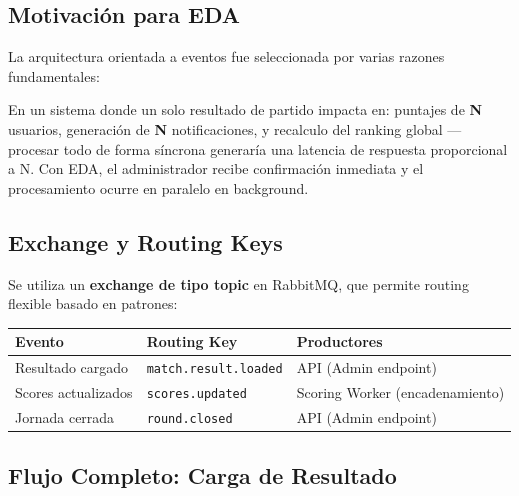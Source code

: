 \documentclass[12pt,a4paper]{article}
\newcommand{\code}[1]{\texttt{\small\color{navy}#1}}
\begin{document}
\subsection{Motivación para EDA}

La arquitectura orientada a eventos fue seleccionada por varias razones fundamentales:

\begin{infobox}
En un sistema donde un solo resultado de partido impacta en: puntajes de \textbf{N} usuarios,
generación de \textbf{N} notificaciones, y recalculo del ranking global — procesar todo de forma
síncrona generaría una latencia de respuesta proporcional a N. Con EDA, el administrador recibe
confirmación inmediata y el procesamiento ocurre en paralelo en background.
\end{infobox}

\subsection{Exchange y Routing Keys}

Se utiliza un \textbf{exchange de tipo topic} en RabbitMQ, que permite routing flexible basado
en patrones:

\begin{center}
\begin{tabular}{@{}lll@{}}
  \toprule
  \textbf{Evento} & \textbf{Routing Key} & \textbf{Productores} \\
  \midrule
  Resultado cargado    & \code{match.result.loaded} & API (Admin endpoint) \\
  Scores actualizados  & \code{scores.updated}      & Scoring Worker (encadenamiento) \\
  Jornada cerrada      & \code{round.closed}        & API (Admin endpoint) \\
  \bottomrule
\end{tabular}
\end{center}

\subsection{Flujo Completo: Carga de Resultado}
\end{document}

